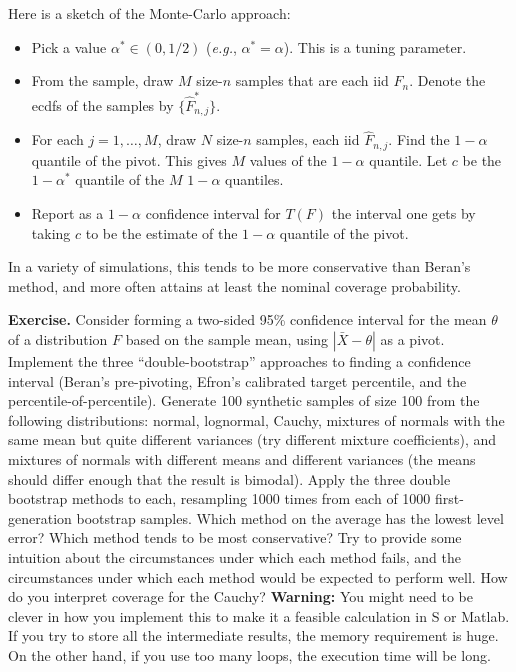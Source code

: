 Here is a sketch of the Monte-Carlo approach:
\begin{itemize}
\item Pick a value $\alpha^* \in (0, 1/2)$ ({\em e.g.}, $\alpha^* = \alpha$).  This is a tuning
parameter.
\item From the sample, draw $M$ size-$n$ samples that are each iid
$\hat{F}_n$. Denote the ecdfs of the samples by $\{ \hat{F}_{n,j}^*\}$.
\item For each $j = 1, \ldots, M$, draw $N$ size-$n$ samples, each iid
$\hat{F}_{n,j}$. Find the $1-\alpha$ quantile of the pivot.
This gives $M$ values of the $1-\alpha$ quantile.
Let $c$ be the $1-\alpha^*$ quantile of the $M$ $1-\alpha$ quantiles.
\item
Report as a $1-\alpha$ confidence interval for  $T(F)$ the interval one gets
by taking $c$ to be the estimate of the $1-\alpha$ quantile of the pivot.
\end{itemize}
In a variety of simulations, this tends to be more conservative than Beran's method, and more
often attains at least the nominal coverage probability.

\noindent
{\bf Exercise.}
Consider forming a two-sided 95\% confidence interval for the mean $\theta$ of
a distribution $F$ based on the sample mean,
using $| \bar{X} - \theta |$ as a pivot.
Implement the three ``double-bootstrap'' approaches to finding a confidence interval
(Beran's pre-pivoting, Efron's  calibrated target percentile, and the
percentile-of-percentile).
Generate 100 synthetic samples of size 100 from the following distributions: normal,
lognormal, Cauchy,
mixtures of normals with the same mean but quite different variances (try different
mixture coefficients), and mixtures of normals with different means and different variances
(the means should differ enough that the result is bimodal).
Apply the three double bootstrap methods to each, resampling 1000 times from each of
1000 first-generation bootstrap samples.
Which method on the average has the lowest level error? Which method tends to be most
conservative?  Try to provide some intuition about the circumstances under
which each method fails, and the circumstances under which each method would be expected
to perform well.
How do you interpret coverage for the Cauchy?
{\bf Warning:} You might need to be clever in how you implement this to make it
a feasible calculation in S or Matlab.  If you try to store all the intermediate results,
the memory requirement is huge. On the other hand, if you use too many loops, the
execution time will be long.

